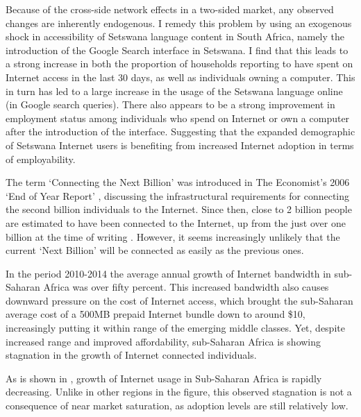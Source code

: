 \documentclass[a4paper,british]{article}\usepackage[]{graphicx}\usepackage[]{color}
\begin{document}
Because of the cross-side network effects in a two-sided market, any
observed changes are inherently endogenous. I remedy this problem
by using an exogenous shock in accessibility of Setswana language
content in South Africa, namely the introduction of the Google Search
interface in Setswana. I find that this leads to a strong increase
in both the proportion of households reporting to have spent on Internet
access in the last 30 days, as well as individuals owning a computer.
This in turn has led to a large increase in the usage of the Setswana
language online (in Google search queries). There also appears to
be a strong improvement in employment status among individuals who
spend on Internet or own a computer after the introduction of the
interface. Suggesting that the expanded demographic of Setswana Internet
users is benefiting from increased Internet adoption in terms of employability.

The term `Connecting the Next Billion' was introduced in The Economist's
2006 `End of Year Report' \citep{standage2006connecting}, discussing
the infrastructural requirements for connecting the second billion
individuals to the Internet. Since then, close to 2 billion people
are\emph{ }estimated to have been connected to the Internet, up from
the just over one billion at the time of writing \citep{sanou2015world}.
However, it seems increasingly unlikely that the current `Next Billion'
will be connected as easily as the previous ones. 

In the period 2010-2014 the average annual growth of Internet bandwidth
in sub-Saharan Africa was over fifty percent. This increased bandwidth
also causes downward pressure on the cost of Internet access, which
brought the sub-Saharan average cost of a 500MB prepaid Internet bundle
down to around \$10, increasingly putting it within range of the emerging
middle classes. Yet, despite increased range and improved affordability,
sub-Saharan Africa is showing stagnation in the growth of Internet
connected individuals.

As is shown in , growth of Internet usage
in Sub-Saharan Africa is rapidly decreasing. Unlike in other regions
in the figure, this observed stagnation is not a consequence of near
market saturation, as adoption levels are still relatively low.
\end{document}
